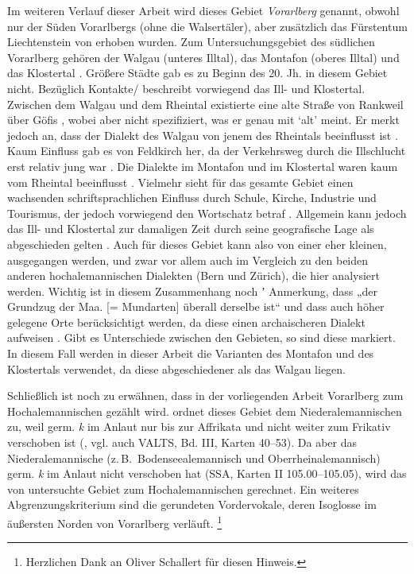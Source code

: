 Im weiteren Verlauf dieser Arbeit wird dieses Gebiet \textit{Vorarlberg} genannt, obwohl nur der Süden Vorarlbergs (ohne die Walsertäler), aber zusätzlich das Fürstentum Liechtenstein von \citet{Jutz1925} erhoben wurden. Zum Untersuchungsgebiet des südlichen Vorarlberg gehören der Walgau (unteres Illtal), das Montafon (oberes Illtal) und das Klostertal \citep[3]{Jutz1925}. Größere Städte gab es zu Beginn des 20. Jh. in diesem Gebiet nicht. Bezüglich Kontakte/ beschreibt \citet{Jutz1925} vorwiegend das Ill- und Klostertal. Zwischen dem Walgau und dem Rheintal existierte eine alte Straße von Rankweil über Göfis \citep[6]{Jutz1925}, wobei \citet{Jutz1925} aber nicht spezifiziert, was er genau mit ‘alt’ meint. Er merkt jedoch an, dass der Dialekt des Walgau von jenem des Rheintals beeinflusst ist \citep[3]{Jutz1925}. Kaum Einfluss gab es von Feldkirch her, da der Verkehrsweg durch die Illschlucht erst relativ jung war \citep[5]{Jutz1925}. Die Dialekte im Montafon und im Klostertal waren kaum vom Rheintal beeinflusst \citep[3]{Jutz1925}. Vielmehr sieht \citet{Jutz1925} für das gesamte Gebiet einen wachsenden schriftsprachlichen Einfluss durch Schule, Kirche, Industrie und Tourismus, der jedoch vorwiegend den Wortschatz betraf \citep[4--5]{Jutz1925}. Allgemein kann jedoch das Ill- und Klostertal zur damaligen Zeit durch seine geografische Lage als abgeschieden gelten \citep[3]{Jutz1925}. Auch für dieses Gebiet kann also von einer eher kleinen,  ausgegangen werden, und zwar vor allem auch im Vergleich zu den beiden anderen hochalemannischen Dialekten (Bern und Zürich), die hier analysiert werden. Wichtig ist in diesem Zusammenhang noch \citeauthor{Jutz1925}ʼ \citeyearpar{Jutz1925} Anmerkung, dass „der Grundzug der Maa. [= Mundarten] überall derselbe ist“ und dass auch höher gelegene Orte berücksichtigt werden, da diese einen archaischeren Dialekt aufweisen \citep[7, 9]{Jutz1925}. Gibt es Unterschiede zwischen den Gebieten, so sind diese markiert. In diesem Fall werden in dieser Arbeit die Varianten des Montafon und des Klostertals verwendet, da diese abgeschiedener als das Walgau liegen.

Schließlich ist noch zu erwähnen, dass in der vorliegenden Arbeit Vorarlberg zum Hochalemannischen gezählt wird. \citet{Jutz1925} ordnet dieses Gebiet dem Niederalemannischen zu, weil germ. \textit{k} im Anlaut nur bis zur Affrikata und nicht weiter zum Frikativ verschoben ist (\citealt[9]{Jutz1925}, vgl. auch VALTS, Bd. III, Karten 40–53). Da aber das Niederalemannische (z.\,B.\ Bodenseealemannisch und Oberrheinalemannisch) germ. \textit{k} im Anlaut nicht verschoben hat (SSA, Karten II 105.00–105.05), wird das von \citet{Jutz1925} untersuchte Gebiet zum Hochalemannischen gerechnet. Ein weiteres Abgrenzungskriterium sind die gerundeten Vordervokale, deren Isoglosse im äußersten Norden von Vorarlberg verläuft. \footnote{Herzlichen Dank an Oliver Schallert für diesen Hinweis.}

